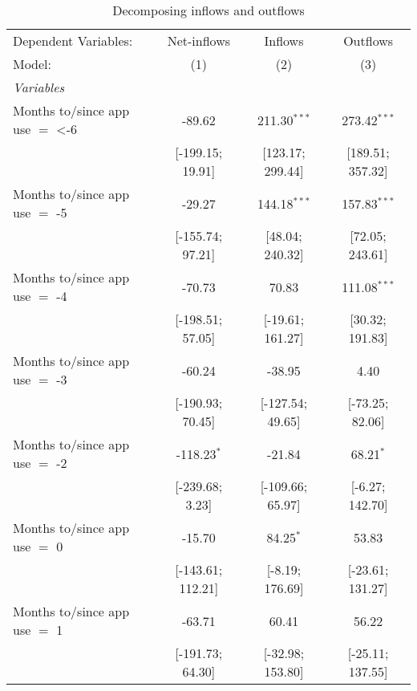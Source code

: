 
\begin{table}[htbp]
   \centering
   \tiny
   \begin{threeparttable}[b]
      \caption{\label{tab:reg_decomp_inout} Decomposing inflows and outflows}
      \begin{tabular}{lccc}
         \tabularnewline \midrule \midrule
         Dependent Variables:            & Net-inflows       & Inflows          & Outflows\\  
         Model:                          & (1)               & (2)              & (3)\\  
         \midrule
         \emph{Variables}\\
         Months to/since app use $=$ <-6 & -89.62            & 211.30$^{***}$   & 273.42$^{***}$\\   
                                         & [-199.15; 19.91]  & [123.17; 299.44] & [189.51; 357.32]\\   
         Months to/since app use $=$ -5  & -29.27            & 144.18$^{***}$   & 157.83$^{***}$\\   
                                         & [-155.74; 97.21]  & [48.04; 240.32]  & [72.05; 243.61]\\   
         Months to/since app use $=$ -4  & -70.73            & 70.83            & 111.08$^{***}$\\   
                                         & [-198.51; 57.05]  & [-19.61; 161.27] & [30.32; 191.83]\\   
         Months to/since app use $=$ -3  & -60.24            & -38.95           & 4.40\\   
                                         & [-190.93; 70.45]  & [-127.54; 49.65] & [-73.25; 82.06]\\   
         Months to/since app use $=$ -2  & -118.23$^{*}$     & -21.84           & 68.21$^{*}$\\   
                                         & [-239.68; 3.23]   & [-109.66; 65.97] & [-6.27; 142.70]\\   
         Months to/since app use $=$ 0   & -15.70            & 84.25$^{*}$      & 53.83\\   
                                         & [-143.61; 112.21] & [-8.19; 176.69]  & [-23.61; 131.27]\\   
         Months to/since app use $=$ 1   & -63.71            & 60.41            & 56.22\\   
                                         & [-191.73; 64.30]  & [-32.98; 153.80] & [-25.11; 137.55]\\   

\end{tabular}
\end{threeparttable}
\end{table}
